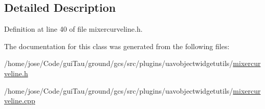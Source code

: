 \subsection{Detailed Description}


Definition at line 40 of file mixercurveline.\-h.



The documentation for this class was generated from the following files\-:\begin{DoxyCompactItemize}
\item 
/home/jose/\-Code/gui\-Tau/ground/gcs/src/plugins/uavobjectwidgetutils/\hyperlink{mixercurveline_8h}{mixercurveline.\-h}\item 
/home/jose/\-Code/gui\-Tau/ground/gcs/src/plugins/uavobjectwidgetutils/\hyperlink{mixercurveline_8cpp}{mixercurveline.\-cpp}\end{DoxyCompactItemize}
